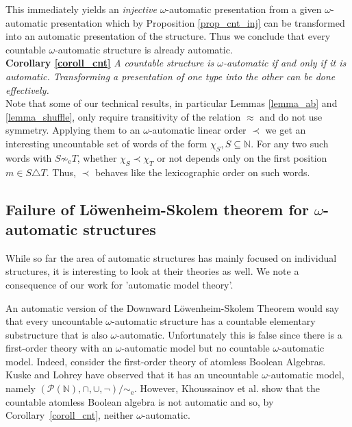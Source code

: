 \documentclass{stacs_proc}
\newcommand{\Nat}{\mathbb{N}}
\newcommand{\eqe}{\sim_{\textrm{e}}}
\newcommand{\calP}{\mathcal{P}}
\begin{document}
This immediately yields an \emph{injective} $\omega$-automatic presentation
from a given $\omega$-automatic presentation which by Proposition
\ref{prop_cnt_inj} can be transformed into an automatic presentation of the
structure. Thus we conclude that every countable $\omega$-automatic structure
is already automatic. \\[0.5 em]

\noindent
{\bf Corollary \ref{coroll_cnt}}
{\it A countable structure is $\omega$-automatic if and only if it is automatic.
Transforming a presentation of one type into the other can be done effectively.
}\\[0.5 em]

Note that some of our technical results, in particular Lemmas \ref{lemma_ab}
and \ref{lemma_shuffle}, only require transitivity of the relation $\approx$
and do not use symmetry. Applying them to an $\omega$-automatic linear order
$\prec$ we get an interesting uncountable set of words of the form
$\chi_S, S \subseteq \Nat$.
For any two such words with $S \not \eqe T$, whether $\chi_S \prec \chi_T$ or not
depends only on the first position $m \in S \triangle T$.
Thus, $\prec$ behaves like the lexicographic order on such words.


\vskip-0.3cm
\subsection{Failure of L\"owenheim-Skolem theorem for $\omega$-automatic structures}

While so far the area of automatic structures has mainly focused on
individual structures, it is interesting to look at their theories as well.
We note a consequence of our work for 'automatic model theory'. 

An automatic version of the Downward L\"owenheim-Skolem Theorem would
say that every uncountable $\omega$-automatic structure has a countable
elementary substructure that is also $\omega$-automatic.  Unfortunately this is
false since there is a first-order theory with an $\omega$-automatic model but
no countable $\omega$-automatic model.  Indeed, consider the first-order theory
of atomless Boolean Algebras. Kuske and Lohrey \cite{KL06} have observed that
it has an uncountable $\omega$-automatic model, namely $(\calP(\Nat), \cap,
\cup, \neg)/\eqe$.  However, Khoussainov et al. \cite{KNRS04} show that the
countable atomless Boolean algebra is not automatic and so, by Corollary~\ref{coroll_cnt}, 
neither $\omega$-automatic.
\end{document}
